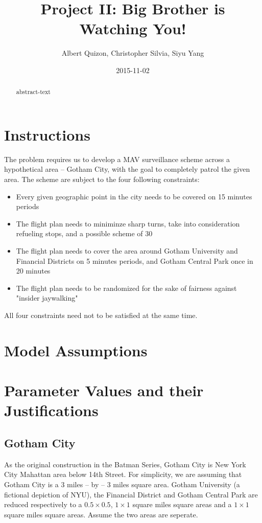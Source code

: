 \documentclass{article}
\title{Project II: Big Brother is Watching You!}
\date{2015-11-02}
\author{Albert Quizon, Christopher Silvia, Siyu Yang}
\begin{document}
\maketitle

\begin{abstract}
   abstract-text
\end{abstract}

\newpage

\section{Instructions}
The problem requires us to develop a MAV surveillance scheme across a hypothetical area -- Gotham City, with the goal to completely patrol the given area. The scheme are subject to the four following constraints:
\begin{itemize}
\item Every given geographic point in the city needs to be covered on 15 minutes periods
\item The flight plan needs to miniminze sharp turns, take into consideration refueling stops, and a possible scheme of 30%
\item The flight plan needs to cover the area around Gotham University and Financial Districts on 5 minutes periods, and Gotham Central Park once in 20 minutes
\item The flight plan needs to be randomized for the sake of fairness against "insider jaywalking"
\end{itemize}
All four constraints need not to be satisfied at the same time.

\section{Model Assumptions}
\section{Parameter Values and their Justifications}
\subsection {Gotham City}
As the original construction in the Batman Series, Gotham City is New York City Mahattan area below 14th Street. For simplicity, we are assuming that Gotham City is a 3 miles – by – 3 miles square area. Gotham University (a fictional depiction of NYU), the Financial District and Gotham Central Park are reduced respectively to a $0.5 \times 0.5$,  $1 \times 1$ square miles square areas and a $1 \times 1$ square miles square areas. Assume the two areas are seperate.
\end{document}
